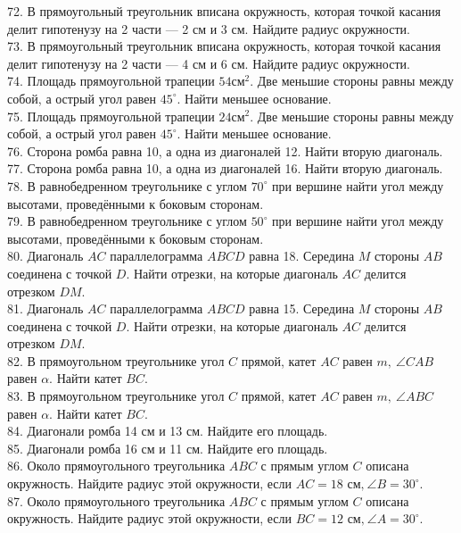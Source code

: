 72. В прямоугольный треугольник вписана окружность, которая точкой касания делит гипотенузу на 2 части --- 2 см и 3 см. Найдите радиус окружности.\\
73. В прямоугольный треугольник вписана окружность, которая точкой касания делит гипотенузу на 2 части --- 4 см и 6 см. Найдите радиус окружности.\\
74. Площадь прямоугольной трапеции $54\text{см}^2.$ Две меньшие стороны равны между собой, а острый угол равен $45^\circ.$ Найти меньшее основание.\\
75. Площадь прямоугольной трапеции $24\text{см}^2.$ Две меньшие стороны равны между собой, а острый угол равен $45^\circ.$ Найти меньшее основание.\\
76. Сторона ромба равна 10, а одна из диагоналей 12. Найти вторую диагональ.\\
77. Сторона ромба равна 10, а одна из диагоналей 16. Найти вторую диагональ.\\
78. В равнобедренном треугольнике с углом $70^\circ$ при вершине найти угол между высотами, проведёнными к боковым сторонам.\\
79. В равнобедренном треугольнике с углом $50^\circ$ при вершине найти угол между высотами, проведёнными к боковым сторонам.\\
80. Диагональ $AC$ параллелограмма $ABCD$ равна 18. Середина $M$ стороны $AB$ соединена с точкой $D.$ Найти отрезки, на которые диагональ $AC$ делится отрезком $DM.$\\
81. Диагональ $AC$ параллелограмма $ABCD$ равна 15. Середина $M$ стороны $AB$ соединена с точкой $D.$ Найти отрезки, на которые диагональ $AC$ делится отрезком $DM.$\\
82. В прямоугольном треугольнике угол $C$ прямой, катет $AC$ равен $m,\ \angle CAB$ равен $\alpha.$ Найти катет $BC.$\\
83. В прямоугольном треугольнике угол $C$ прямой, катет $AC$ равен $m,\ \angle ABC$ равен $\alpha.$ Найти катет $BC.$\\
84. Диагонали ромба 14 см и 13 см. Найдите его площадь.\\
85. Диагонали ромба 16 см и 11 см. Найдите его площадь.\\
86. Около прямоугольного треугольника $ABC$ с прямым углом $C$ описана окружность. Найдите радиус этой окружности, если $AC=18\text{ см,}\ \angle B=30^\circ.$\\
87. Около прямоугольного треугольника $ABC$ с прямым углом $C$ описана окружность. Найдите радиус этой окружности, если $BC=12\text{ см,}\ \angle A=30^\circ.$\\
